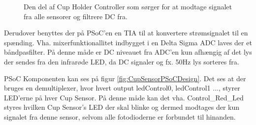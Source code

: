 \documentclass[Rapport/Rapport_main.tex]{subfiles}
\begin{document}
\begin{figure}[H]
    \centering
    \caption{Den del af Cup Holder Controller som sørger for at modtage signalet fra alle sensorer og filtrere DC fra.}
    \label{fig:CupSensorCupHolderControllerPart}
\end{figure}

Derudover benyttes der på PSoC'en en TIA til at konvertere strømsignalet til en spænding. Vha. mixerfunktionallitet indbygget i en Delta Sigma ADC laves der et båndpasfilter. På denne måde er DC niveauet fra ADC'en kun afhængig af det lys der sendes fra den infrarøde LED, da DC signaler og fx. 50Hz lys sorteres fra.

PSoC Komponenten kan ses på figur \ref{fig:CupSensorPSoCDesign}. Det ses at der bruges en demultiplexer, hvor hvert output ledControl0, ledControl1 ..., styrer LED'erne på hver Cup Sensor. På denne måde kan det vha. Control\_Red\_Led styres hvilken Cup Sensor's LED der skal blinke og dermed modtages der kun signalet fra denne sensor, selvom alle fotodioderne er forbundet til hinanden.  
\end{document}
